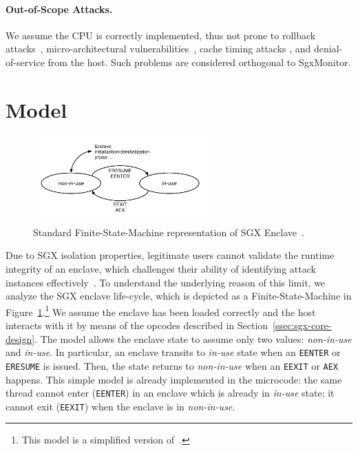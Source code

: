 \paragraph{Out-of-Scope Attacks.}
We assume the CPU is correctly implemented, thus not prone to rollback 
attacks~\citep{197191}, micro-architectural 
vulnerabilities~\citep{7163052,van2017telling,203183,203698,10.1145/3133956.3134038,kocher2019spectre,van2020lvi},
cache timing attacks 
\citep{206170,moghimi2017cachezoom,10.1145/3065913.3065915},
and denial-of-service from the host.
Such problems are considered orthogonal to SgxMonitor.

\section{Model}
\label{sec:model_sgxmonitor}

\begin{figure}[t]
	\centering
	\includegraphics[width=0.6\textwidth]{fig_c6/fmi-standard}
	\caption[Standard SGX FSM.]{Standard Finite-State-Machine representation of 
	SGX Enclave~\citep{costan2016intel}.}
	\label{fig:fmi-standard}
\end{figure}

Due to SGX isolation properties, legitimate users cannot validate the runtime 
integrity of an 
enclave, which challenges their ability of identifying attack instances
effectively~\citep{snakegx,biondo2018guard,lee2017hacking}.
To understand the underlying reason of this limit, we analyze the SGX 
enclave life-cycle, which is depicted as a Finite-State-Machine in 
Figure~\ref{fig:fmi-standard}.\footnote{This model is a simplified version 
of~\cite{costan2016intel}.}
We assume the enclave has been loaded correctly and the host interacts with it 
by means of the opcodes described in Section~\ref{ssec:sgx-core-design}.
The model allows the enclave state to assume only two values: 
\emph{non-in-use} and \emph{in-use}.
In particular, an enclave transits to \emph{in-use} state when an 
\texttt{EENTER} or \texttt{ERESUME} is issued.
Then, the state returns to \emph{non-in-use} when an \texttt{EEXIT} or  
\texttt{AEX} happens.
This simple model is already implemented in the microcode: the same thread 
cannot enter (\ie \texttt{EENTER}) in an enclave which is 
already in \emph{in-use} state; it cannot exit (\ie \texttt{EEXIT}) when the 
enclave is in \emph{non-in-use}.

